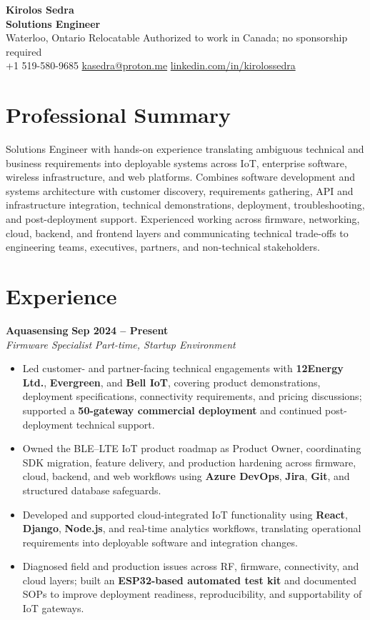 \documentclass[letterpaper,11pt]{article}
\newcommand{\resumeSubheading}[4]{
  \textbf{#1} \hfill \textbf{#2} \\
  \textit{#3} \hfill \textit{#4} \\
}
\begin{document}
\begin{center}
{\LARGE \textbf{Kirolos Sedra}} \\
\textbf{Solutions Engineer} \\
Waterloo, Ontario \textbar{} Relocatable \textbar{} Authorized to work in Canada; no sponsorship required \\
+1 519-580-9685 \textbar{}
\href{mailto:kasedra@proton.me}{kasedra@proton.me} \textbar{}
\href{https://linkedin.com/in/kirolossedra}{linkedin.com/in/kirolossedra}
\end{center}
\vspace{-4pt}

\section{Professional Summary}
Solutions Engineer with hands-on experience translating ambiguous technical and business requirements into deployable systems across IoT, enterprise software, wireless infrastructure, and web platforms. Combines software development and systems architecture with customer discovery, requirements gathering, API and infrastructure integration, technical demonstrations, deployment, troubleshooting, and post-deployment support. Experienced working across firmware, networking, cloud, backend, and frontend layers and communicating technical trade-offs to engineering teams, executives, partners, and non-technical stakeholders.

\section{Experience}

\resumeSubheading
{Aquasensing}{Sep 2024 -- Present}
{Firmware Specialist}{Part-time, Startup Environment}
\begin{itemize}
  \item Led customer- and partner-facing technical engagements with \textbf{12Energy Ltd.}, \textbf{Evergreen}, and \textbf{Bell IoT}, covering product demonstrations, deployment specifications, connectivity requirements, and pricing discussions; supported a \textbf{50-gateway commercial deployment} and continued post-deployment technical support.
  \item Owned the BLE--LTE IoT product roadmap as Product Owner, coordinating SDK migration, feature delivery, and production hardening across firmware, cloud, backend, and web workflows using \textbf{Azure DevOps}, \textbf{Jira}, \textbf{Git}, and structured database safeguards.
  \item Developed and supported cloud-integrated IoT functionality using \textbf{React}, \textbf{Django}, \textbf{Node.js}, and real-time analytics workflows, translating operational requirements into deployable software and integration changes.
  \item Diagnosed field and production issues across RF, firmware, connectivity, and cloud layers; built an \textbf{ESP32-based automated test kit} and documented SOPs to improve deployment readiness, reproducibility, and supportability of IoT gateways.
\end{itemize}
\end{document}
